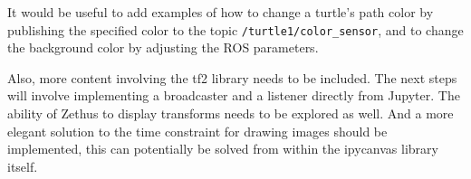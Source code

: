     It would be useful to add examples of how to change a turtle's path color by publishing the specified color to the topic \texttt{/turtle1/color\_sensor}, and to change the background color by adjusting the ROS parameters.

    Also, more content involving the tf2 library needs to be included. The next steps will involve implementing a broadcaster and a listener directly from Jupyter. The ability of Zethus to display transforms needs to be explored as well. And a more elegant solution to the time constraint for drawing images should be implemented, this can potentially be solved from within the ipycanvas library itself.
    
    